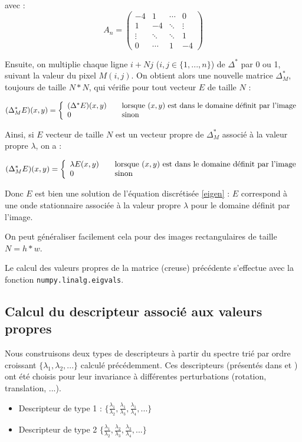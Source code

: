 \documentclass[a4paper,10pt]{article} %
\theoremstyle{definition} %
\begin{document}
avec : $$A_n =  
\begin{pmatrix}
  -4 & 1 & \cdots & 0 \\
  1  & -4 & \ddots &   \vdots \\
  \vdots  & \ddots  & \ddots & 1  \\
  0 & \cdots  & 1 & -4
 \end{pmatrix}  $$

Ensuite, on multiplie chaque ligne $i+Nj$ ($i, j \in \{1, ..., n\}$) de $\Delta^*$ par 0 ou 1, suivant la valeur du pixel $M(i,j)$. On obtient alors une nouvelle matrice $\Delta^*_M$, toujours de taille $N*N$, qui vérifie pour tout vecteur $E$ de taille $N$ : 

\[ (\Delta^*_M E)(x,y) = \left\{ 
  \begin{array}{l l}
    (\Delta^* E)(x,y) & \quad \text{lorsque }(x,y) \text{ est dans le domaine définit par l'image}\\
    0 & \quad \text{sinon}
  \end{array} \right.\]
  
  
  Ainsi, si $E$ vecteur de taille $N$ est un vecteur propre de $\Delta^*_M$ associé à la valeur propre $\lambda$, on a : 
  
  \[ (\Delta^*_M E)(x,y) = \left\{ 
  \begin{array}{l l}
    \lambda E(x,y) & \quad \text{lorsque }(x,y) \text{ est dans le domaine définit par l'image}\\
    0 & \quad \text{sinon}
  \end{array} \right.\]
  
 Donc $E$ est bien une solution de l'équation discrétisée \eqref{eigen} : $E$ correspond à une onde stationnaire associée à la valeur propre $\lambda$ pour le domaine définit par l'image.
  
 On peut généraliser facilement cela pour des images rectangulaires de taille $N = h*w$.
  
 Le calcul des valeurs propres de la matrice (creuse) précédente s'effectue avec la fonction \texttt{numpy.linalg.eigvals}.
  

  \subsection{Calcul du descripteur associé aux valeurs propres}

Nous construisons deux types de descripteurs à partir du spectre trié par ordre croissant $\{\lambda_1, \lambda_2, ...\}$ calculé précédemment. Ces descripteurs (présentés dans \cite{Zuliani04} et \cite{KhabouHR07}) ont été choisis pour leur invariance à différentes perturbations (rotation, translation, ...).
\begin{itemize}
\item Descripteur de type 1 : $\{\frac{\lambda_1}{\lambda_2}, \frac{\lambda_1}{\lambda_3}, \frac{\lambda_1}{\lambda_4}, ... \}$
\item Descripteur de type 2 $\{\frac{\lambda_1}{\lambda_2}, \frac{\lambda_2}{\lambda_3}, \frac{\lambda_3}{\lambda_4},...\}$
\end{itemize}
\end{document}
